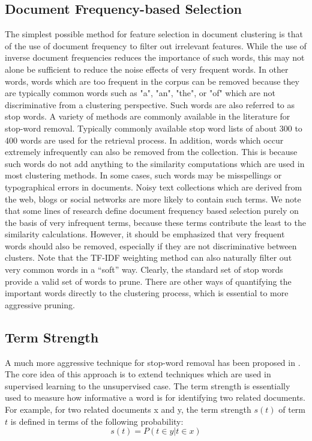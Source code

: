 \subsection{Document Frequency-based Selection}
The simplest possible method for feature selection in document clustering is that of the use of document frequency to filter out irrelevant features. While the use of inverse document frequencies reduces the importance of such words, this may not alone be sufficient to reduce the noise effects of very frequent words. In other words, words which are too frequent in the corpus can be removed because they are typically common words such as "a", "an", "the", or "of" which are not discriminative from a clustering perspective. Such words are also referred to as stop words. A variety of methods are commonly available in the literature for stop-word removal. Typically commonly available stop word lists of about 300 to 400 words are used for the retrieval process. In addition, words which occur extremely infrequently can also be removed from the collection. This is because such words do not add anything to the similarity computations which are used in most clustering methods. In some cases, such words may be misspellings or typographical errors in documents. Noisy text collections which are derived from the web, blogs or social networks are more likely to contain such terms. We note that some lines of research define document frequency based selection purely on the basis of very infrequent terms, because these terms contribute the least to the similarity calculations. However, it should be emphasized that very frequent words should also be removed, especially if they are not discriminative between clusters. Note that the TF-IDF weighting method can also naturally filter out very common words in a “soft” way. Clearly, the standard set of stop words provide a valid set of words to prune. There are other ways of quantifying the important words directly to the clustering process, which is essential to more aggressive pruning.

\subsection{Term Strength}
A much more aggressive technique for stop-word removal has been proposed in \cite{Wilbur1992}. The core idea of this approach
is to extend techniques which are used in supervised learning to the unsupervised case. The term strength is essentially used to measure how informative a word is for identifying two related documents. For example, for two related documents x and y, the term strength $s(t)$ of term $t$ is defined in terms of the following probability:
\[
    s(t) = P(t \in y | t \in x)
    \label{eq:probTermStrength} \tag{233}
\]

